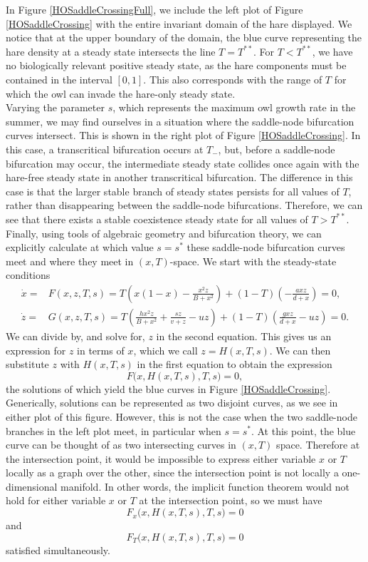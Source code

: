 \documentclass[12pt]{UOthesis}
\theoremstyle{remarkstyle}
\begin{document}
In Figure \ref{HOSaddleCrossingFull}, we include the left plot of Figure \ref{HOSaddleCrossing} with the entire invariant domain of the hare displayed. We notice that at the upper boundary of the domain, the blue curve representing the hare density at a steady state intersects the line $T=T^{**}$. For $T<T^{**}$, we have no biologically relevant positive steady state, as the hare components must be contained in the interval $[0,1]$. This also corresponds with the range of $T$ for which the owl can invade the hare-only steady state.\\

Varying the parameter $s$, which represents the maximum owl growth rate in the summer, we may find ourselves in a situation where the saddle-node bifurcation curves intersect. This is shown in the right plot of Figure \ref{HOSaddleCrossing}. In this case, a transcritical bifurcation occurs at $T_-$, but, before a saddle-node bifurcation may occur, the intermediate steady state collides once again with the hare-free steady state in another transcritical bifurcation. The difference in this case is that the larger stable branch of steady states persists for all values of $T$, rather than disappearing between the saddle-node bifurcations. Therefore, we can see that there exists a stable coexistence steady state for all values of $T>T^{**}$.\\

Finally, using tools of algebraic geometry and bifurcation theory, we can explicitly calculate at which value $s=s^*$ these saddle-node bifurcation curves meet and where they meet in $(x,T)$-space. We start with the steady-state conditions
\begin{equation*}
	\begin{split}
		\dot{x}=& F(x,z,T,s)=T\left(x(1-x)-\frac{x^2z}{B+x^2}\right)+(1-T)\left(-\frac{axz}{d+x}\right)=0,\\
		\dot{z}=& G(x,z,T,s)=T\left(\frac{hx^2z}{B+x^2}+\frac{sz}{v+z}-uz\right)+(1-T)\left(\frac{gxz}{d+x}-uz\right)=0.
		\end{split}
\end{equation*}
We can divide by, and solve for, $z$ in the second equation. This gives us an expression for $z$ in terms of $x$, which we call $z=H(x,T,s)$. We can then substitute $z$ with $H(x,T,s)$ in the first equation to obtain the expression
$$F\Big(x,H(x,T,s),T,s\Big)=0,$$
the solutions of which yield the blue curves in Figure \ref{HOSaddleCrossing}. Generically, solutions can be represented as two disjoint curves, as we see in either plot of this figure. However, this is not the case when the two saddle-node branches in the left plot meet, in particular when $s=s^*$. At this point, the blue curve can be thought of as two intersecting curves in $(x,T)$ space. Therefore at the intersection point, it would be impossible to express either variable $x$ or $T$ locally as a graph over the other, since the intersection point is not locally a one-dimensional manifold. In other words, the implicit function theorem would not hold for either variable $x$ or $T$ at the intersection point, so we must have 
$$ F_x\Big(x,H(x,T,s),T,s\Big)=0$$
and
$$F_T\Big(x,H(x,T,s),T,s\Big)=0$$
satisfied simultaneously.\\
\end{document}
